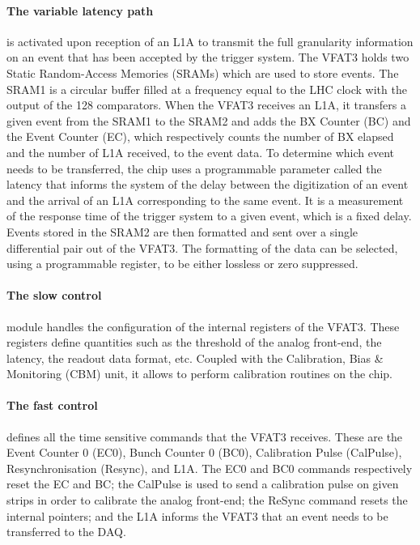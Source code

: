      \paragraph{The variable latency path} is activated upon reception of an L1A to transmit the full granularity information on an event that has been accepted by the trigger system. The VFAT3 holds two Static Random-Access Memories (SRAMs) which are used to store events. The SRAM1 is a circular buffer filled at a frequency equal to the LHC clock with the output of the 128 comparators. When the VFAT3 receives an L1A, it transfers a given event from the SRAM1 to the SRAM2 and adds the BX Counter (BC) and the Event Counter (EC), which respectively counts the number of BX elapsed and the number of L1A received, to the event data. To determine which event needs to be transferred, the chip uses a programmable parameter called the latency that informs the system of the delay between the digitization of an event and the arrival of an L1A corresponding to the same event. It is a measurement of the response time of the trigger system to a given event, which is a fixed delay. Events stored in the SRAM2 are then formatted and sent over a single differential pair out of the VFAT3. The formatting of the data can be selected, using a programmable register, to be either lossless or zero suppressed. \\

      \paragraph{The slow control} module handles the configuration of the internal registers of the VFAT3. These registers define quantities such as the threshold of the analog front-end, the latency, the readout data format, etc. Coupled with the Calibration, Bias \& Monitoring (CBM) unit, it allows to perform calibration routines on the chip. \\

      \paragraph{The fast control} defines all the time sensitive commands that the VFAT3 receives. These are the Event Counter 0 (EC0), Bunch Counter 0 (BC0), Calibration Pulse (CalPulse), Resynchronisation (Resync), and L1A. The EC0 and BC0 commands respectively reset the EC and BC; the CalPulse is used to send a calibration pulse on given strips in order to calibrate the analog front-end; the ReSync command resets the internal pointers; and the L1A informs the VFAT3 that an event needs to be transferred to the DAQ.

